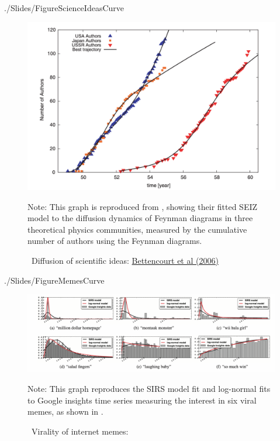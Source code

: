 \begin{verbatimwrite}{./Slides/FigureScienceIdeasCurve}
\begin{figure}[!ht] \centering  %
	\caption{ ~Diffusion of scientific ideas: \href{http://web.mit.edu/dikaiser/www/BAKC.PhysA.pdf}{Bettencourt et al (2006)}}\nocite{bettencourt2006power}
	\label{fig:science_ideas_curve}
	\centerline{\includegraphics[width=\textwidth]{./figures/Feynman}}
		\begin{flushleft}{\footnotesize Note: This graph is reproduced from \cite{bettencourt2006power}, showing their fitted SEIZ model to the diffusion dynamics of Feynman diagrams in three theoretical physics communities, measured by the cumulative number of authors using the Feynman diagrams.}
	\end{flushleft}
\end{figure}
\end{verbatimwrite}%


\newpage

\begin{verbatimwrite}{./Slides/FigureMemesCurve}
\begin{figure}[!ht] \centering  %
	\caption{ ~Virality of internet memes: \href{https://github.com/iworld1991/EpiExp/blob/master/Literature/bauckhage2011insights.pdf}{\cite{bauckhage2011insights}}}
	\label{fig:memes_curve}
	\centerline{\includegraphics[width=\textwidth]{./figures/Memes}}
	\begin{flushleft}{\footnotesize Note: This graph reproduces the SIRS model fit and log-normal fits to Google insights time series measuring the interest in six viral memes, as shown in  \cite{bauckhage2011insights}. }
\end{flushleft}
\end{figure}
\end{verbatimwrite}%

